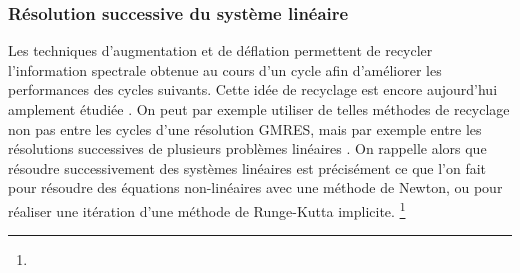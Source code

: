     \subsubsection{Résolution successive du système linéaire}
    Les techniques d'augmentation et de déflation permettent de recycler l'information spectrale obtenue au cours d'un cycle afin d'améliorer les performances des cycles suivants.
    Cette idée de recyclage est encore aujourd'hui amplement étudiée \cite{JolivetTournier2016}.
    On peut par exemple utiliser de telles méthodes de recyclage non pas entre les cycles d'une résolution GMRES, mais par exemple entre les résolutions successives de plusieurs problèmes linéaires \cite{Gaul2014}.
    On rappelle alors que résoudre successivement des systèmes linéaires est précisément ce que l'on fait pour résoudre des équations non-linéaires avec une méthode de Newton, ou pour réaliser une itération d'une méthode de Runge-Kutta implicite.
    \footnote{}
